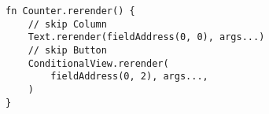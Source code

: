 \begin{lstlisting}[language=my_pseudo,caption=Автоматически сгенерированная процедура обновления интерфейса,label={lst:accord-generated-update}]
fn Counter.rerender() {
    // skip Column
    Text.rerender(fieldAddress(0, 0), args...)
    // skip Button
    ConditionalView.rerender(
        fieldAddress(0, 2), args...,
    )
}
\end{lstlisting}